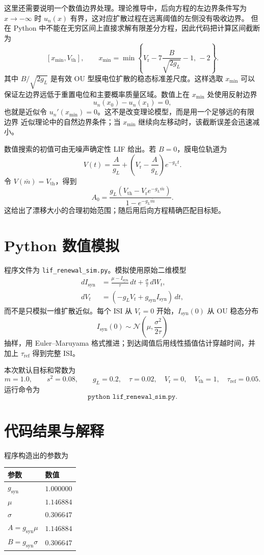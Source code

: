 \documentclass[UTF8]{ctexart}
\begin{document}
这里还需要说明一个数值边界处理。理论推导中，后向方程的左边界条件写为
$x\to-\infty$ 时 $u_n(x)$ 有界，这对应扩散过程在远离阈值的左侧没有吸收边界。
但在 Python 中不能在无穷区间上直接求解有限差分方程，因此代码把计算区间截断为
\[
[x_{\min},V_{\mathrm{th}}],
\qquad
x_{\min}
=\min\left\{
V_{\mathrm r}-7\frac{B}{\sqrt{2g_L}}-1,\,-2
\right\}.
\]
其中 $B/\sqrt{2g_L}$ 是有效 OU 型膜电位扩散的稳态标准差尺度。这样选取
$x_{\min}$ 可以保证左边界远低于重置电位和主要概率质量区域。数值上在
$x_{\min}$ 处使用反射边界
\[
u_n(x_0)-u_n(x_1)=0,
\]
也就是近似令 $u_n'(x_{\min})=0$。这不是改变理论模型，而是用一个足够远的有限边界
近似理论中的自然边界条件；当 $x_{\min}$ 继续向左移动时，该截断误差会迅速减小。

数值搜索的初值可由无噪声确定性 LIF 给出。若 $B=0$，膜电位轨道为
\[
V(t)=\frac{A}{g_L}+\left(V_{\mathrm r}-\frac{A}{g_L}\right)e^{-g_Lt}.
\]
令 $V(\bar m)=V_{\mathrm{th}}$，得到
\[
A_0=
\frac{g_L\left(V_{\mathrm{th}}-V_{\mathrm r}e^{-g_L\bar m}\right)}
{1-e^{-g_L\bar m}}.
\]
这给出了漂移大小的合理初始范围；随后用后向方程精确匹配目标矩。

\section{Python 数值模拟}

程序文件为 \texttt{lif\_renewal\_sim.py}。模拟使用原始二维模型
\begin{align*}
dI_{\mathrm{syn}}
&=\frac{\mu-I_{\mathrm{syn}}}{\tau}\,dt+\frac{\sigma}{\tau}\,dW_t,\\
dV_t&=(-g_LV_t+g_{\mathrm{syn}}I_{\mathrm{syn}})\,dt,
\end{align*}
而不是只模拟一维扩散近似。每个 ISI 从 $V_{\mathrm r}=0$ 开始，$I_{\mathrm{syn}}(0)$
从 OU 稳态分布
\[
I_{\mathrm{syn}}(0)\sim \mathcal N\left(\mu,\frac{\sigma^2}{2\tau}\right)
\]
抽样，用 Euler--Maruyama 格式推进；到达阈值后用线性插值估计穿越时间，并加上
$\tau_{\mathrm{ref}}$ 得到完整 ISI。

本次默认目标和常数为
\[
m=1.0,\qquad s^2=0.08,\qquad
g_L=0.2,\quad \tau=0.02,\quad
V_{\mathrm r}=0,\quad V_{\mathrm{th}}=1,\quad \tau_{\mathrm{ref}}=0.05.
\]
运行命令为
\[
\texttt{python lif\_renewal\_sim.py}.
\]

\section{代码结果与解释}

程序构造出的参数为
\begin{center}
\begin{tabular}{ll}
\toprule
参数 & 数值 \\
\midrule
$g_{\mathrm{syn}}$ & $1.000000$ \\
$\mu$ & $1.146884$ \\
$\sigma$ & $0.306647$ \\
$A=g_{\mathrm{syn}}\mu$ & $1.146884$ \\
$B=g_{\mathrm{syn}}\sigma$ & $0.306647$ \\
\bottomrule
\end{tabular}
\end{center}
\end{document}
